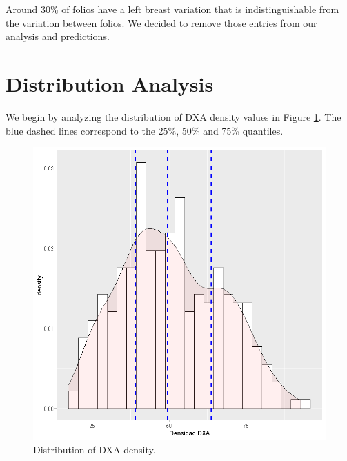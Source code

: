 \documentclass[letterpaper,11pt]{article}
\begin{document}
Around 30\% of folios have a left breast variation that is indistinguishable from the variation between folios.  We decided to remove those entries from our analysis and predictions.

\section*{Distribution Analysis}
We begin by analyzing the distribution of DXA density values in Figure \ref{fig:dxa}. The blue dashed lines correspond to the 25\%, 50\% and 75\% quantiles.
\begin{figure}[!htb]
	\centering
	\includegraphics[trim={0 0cm 0cm 0}, clip, scale=0.55]{figures/distribution_dxa.png}
	\caption{Distribution of DXA density.} 
	\label{fig:dxa}
\end{figure}
\end{document}
